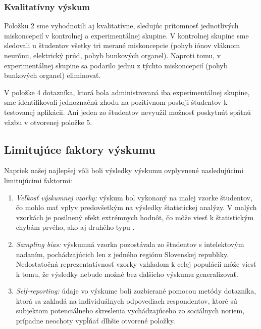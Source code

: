 \subsubsection{Kvalitatívny výskum}
Položku 2 sme vyhodnotili aj kvalitatívne, sledujúc prítomnosť jednotlivých miskoncepcií v kontrolnej a experimentálnej skupine. V kontrolnej skupine sme sledovali u študentov všetky tri merané miskoncepcie 
(pohyb iónov vláknom neurónu, elektrický prúd, pohyb bunkových organel). Naproti tomu, v experimentálnej skupine sa podarilo jednu z týchto miskoncepcií (pohyb bunkových organel) eliminovať.

V položke 4 dotazníka, ktorá bola administrovaná iba experimentálnej skupine, sme identifikovali jednoznačnú zhodu na pozitívnom postoji študentov k testovanej aplikácii. Ani jeden zo študentov nevyužil možnosť poskytnúť
spätnú väzbu v otvorenej položke 5.

\subsection{Limitujúce faktory výskumu}
Napriek našej najlepšej vôli boli výsledky výskumu ovplyvnené nasledujúcimi limitujúcimi faktormi:

\begin{enumerate}
  \item \emph{Veľkosť výskumnej vzorky:} výskum bol vykonaný na malej vzorke študentov, čo mohlo mať vplyv predovšetkým na výsledky štatistickej analýzy. V malých vzorkách je posilnený efekt extrémnych hodnôt, 
  čo môže viesť k štatistickým chybám prvého, ako aj druhého typu \cite{komendaAnalyzaNahodnehoPedagogickem1981}.
  \item \emph{Sampling bias:} výskumná vzorka pozostávala zo študentov s intelektovým nadaním, pochádzajúcich len z jedného regiónu Slovenskej republiky. Nedostatočná reprezentatívnosť vzorky vzhľadom k celej populácii 
  môže viesť k tomu, že výsledky nebude možné bez ďalšieho výskumu generalizovať.
  \item \emph{Self-reporting:} údaje vo výskume boli zozbierané pomocou metódy dotazníka, ktorá sa zakladá na individuálnych odpovediach respondentov, ktoré sú subjektom potenciálneho skreslenia vychádzajúceho
  zo sociálnych noriem, prípadne neochoty vypĺňať dlhšie otvorené položky.
\end{enumerate}

